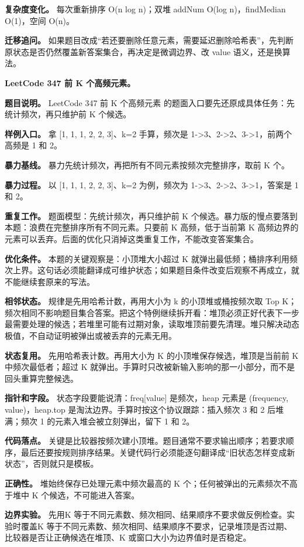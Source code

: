 \textbf{复杂度变化。} 每次重新排序 O(n log n)；双堆 addNum O(log n)，findMedian O(1)，空间 O(n)。

\textbf{迁移追问。} 如果题目改成“若还要删除任意元素，需要延迟删除哈希表”，先判断原状态是否仍然覆盖新答案集合，再决定是微调边界、改 value 语义，还是换算法。

\noindent\textbf{LeetCode 347 前 K 个高频元素。}

\textbf{题目说明。} LeetCode 347 前 K 个高频元素 的题面入口要先还原成具体任务：先统计频次，再只维护前 K 个候选。

\textbf{样例入口。} 拿 [1, 1, 1, 2, 2, 3]、k=2 手算，频次是 1->3、2->2、3->1，前两个高频是 1 和 2。

\textbf{暴力基线。} 暴力先统计频次，再把所有不同元素按频次完整排序，取前 K 个。

\textbf{暴力过程。} 以 [1, 1, 1, 2, 2, 3]、k=2 为例，频次为 1->3、2->2、3->1，答案是 1 和 2。

\textbf{重复工作。} 题面模型：先统计频次，再只维护前 K 个候选。暴力版的慢点要落到本题：浪费在完整排序所有不同元素。只要前 K 高频，低于当前第 K 高频边界的元素可以丢弃。后面的优化只消掉这类重复工作，不能改变答案集合。

\textbf{优化条件。} 本题的关键观察是：小顶堆大小超过 K 就弹出最低频；桶排序利用频次上界。这句话必须能翻译成可维护状态；如果题目条件改变后观察不再成立，就不能继续套原来的写法。

\textbf{相邻状态。} 规律是先用哈希计数，再用大小为 k 的小顶堆或桶按频次取 Top K；频次相同不影响题目集合答案。把这个特例继续拆开看：堆顶必须正好代表下一步最需要处理的候选；若堆里可能有过期对象，读取堆顶前要先清理。堆只解决动态极值，不自动证明被弹出或被丢弃的元素无用。

\textbf{状态复用。} 先用哈希表计数。再用大小为 K 的小顶堆保存候选，堆顶是当前前 K 中频次最低者；超过 K 就弹出。手算时只改被新输入影响的那一小部分，而不是回头重算完整候选。

\textbf{指针和字段。} 状态字段要能说清：freq[value] 是频次，heap 元素是 (frequency, value)，heap.top 是淘汰边界。手算时按这个协议跟踪：插入频次 3 和 2 后堆满；频次 1 的元素入堆会被立刻弹出，留下 1 和 2。

\textbf{代码落点。} 关键是比较器按频次建小顶堆。题目通常不要求输出顺序；若要求顺序，最后还要按规则排序结果。关键代码行必须能逐句翻译成“旧状态怎样变成新状态”，否则就只是模板。

\textbf{正确性。} 堆始终保存已处理元素中频次最高的 K 个；任何被弹出的元素频次不高于堆中 K 个候选，不可能进入答案。

\textbf{边界实验。} 先用K 等于不同元素数、频次相同、结果顺序不要求做反例检查。实验时覆盖K 等于不同元素数、频次相同、结果顺序不要求，记录堆顶是否过期、比较器是否让正确候选在堆顶、K 或窗口大小为边界值时是否稳定。

